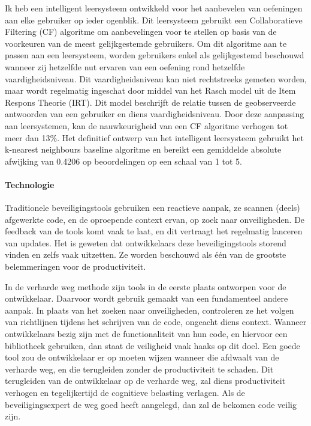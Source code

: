 Ik heb een intelligent leersysteem ontwikkeld voor het aanbevelen van oefeningen aan elke gebruiker op ieder ogenblik.
Dit leersysteem gebruikt een Collaboratieve Filtering (CF) algoritme om aanbevelingen voor te stellen op basis van de voorkeuren van de meest gelijkgestemde gebruikers.
Om dit algoritme aan te passen aan een leersysteem, worden gebruikers enkel als gelijkgestemd beschouwd wanneer zij hetzelfde nut ervaren van een oefening rond hetzelfde vaardigheidsniveau.
Dit vaardigheidsniveau kan niet rechtstreeks gemeten worden, maar wordt regelmatig ingeschat door middel van het Rasch model uit de Item Respons Theorie (IRT).
Dit model beschrijft de relatie tussen de geobserveerde antwoorden van een gebruiker en diens vaardigheidsniveau.
Door deze aanpassing aan leersystemen, kan de nauwkeurigheid van een CF algoritme verhogen tot meer dan 13\%.
Het definitief ontwerp van het intelligent leersysteem gebruikt het k-nearest neighbours baseline algoritme en bereikt een gemiddelde absolute afwijking van 0.4206 op beoordelingen op een schaal van 1 tot 5.

\paragraph{Technologie}
Traditionele beveiligingstools gebruiken een reactieve aanpak, ze scannen (deels) afgewerkte code, en de oproepende context ervan, op zoek naar onveiligheden.
De feedback van de tools komt vaak te laat, en dit vertraagt het regelmatig lanceren van updates.
Het is geweten dat ontwikkelaars deze beveiligingstools storend vinden en zelfs vaak uitzetten.
Ze worden beschouwd als één van de grootste belemmeringen voor de productiviteit.

In de verharde weg methode zijn tools in de eerste plaats ontworpen voor de ontwikkelaar.
Daarvoor wordt gebruik gemaakt van een fundamenteel andere aanpak.
In plaats van het zoeken naar onveiligheden, controleren ze het volgen van richtlijnen tijdens het schrijven van de code, ongeacht diens context.
Wanneer ontwikkelaars bezig zijn met de functionaliteit van hun code, en hiervoor een bibliotheek gebruiken, dan staat de veiligheid vaak haaks op dit doel.
Een goede tool zou de ontwikkelaar er op moeten wijzen wanneer die afdwaalt van de verharde weg, en die terugleiden zonder de productiviteit te schaden.
Dit terugleiden van de ontwikkelaar op de verharde weg, zal diens productiviteit verhogen en tegelijkertijd de cognitieve belasting verlagen.
Als de beveiligingsexpert de weg goed heeft aangelegd, dan zal de bekomen code veilig zijn.


